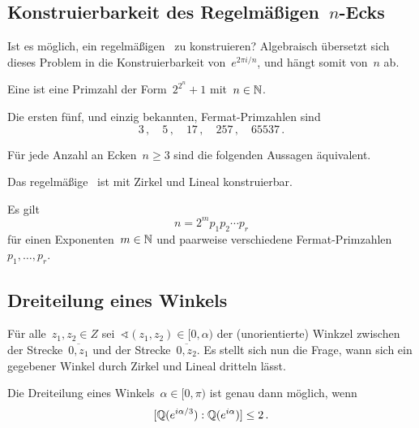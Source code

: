 \subsection{Konstruierbarkeit des Regelmäßigen~\texorpdfstring{$n$}{n}-Ecks}

Ist es möglich, ein regelmäßigen~ zu konstruieren?
Algebraisch übersetzt sich dieses Problem in die Konstruierbarkeit von~$e^{2 \pi i / n}$, und hängt somit von~$n$ ab.

\begin{definition}
  Eine  ist eine Primzahl der Form~$2^{2^n} + 1$ mit~$n \in \mathbb{N}$.
\end{definition}

\begin{example}
  Die ersten fünf, und einzig bekannten, Fermat-Primzahlen sind
  \[
    3 \,,
    \quad
    5 \,,
    \quad
    17 \,,
    \quad
    257 \,,
    \quad
    65537 \,.
  \]
\end{example}

\begin{theorem}[Gauß]
  Für jede Anzahl an Ecken~$n \geq 3$ sind die folgenden Aussagen äquivalent.
  \begin{equivlist}
    \item
      Das regelmäßige~ ist mit Zirkel und Lineal konstruierbar.
    \item
      Es gilt
      \[
        n = 2^m p_1 p_2 \dotsm p_r
      \]
      für einen Exponenten~$m \in \mathbb{N}$ und paarweise verschiedene Fermat-Primzahlen~$p_1, \dotsc, p_r$.
  \end{equivlist}
\end{theorem}



\subsection{Dreiteilung eines Winkels}

Für alle~$z_1, z_2 \in Z$ sei~$\sphericalangle(z_1, z_2) \in [0, \alpha)$ der (unorientierte) Winkzel zwischen der Strecke~$\overline{0,z_1}$ und der Strecke~$\overline{0,z_2}$.
Es stellt sich nun die Frage, wann sich ein gegebener Winkel durch Zirkel und Lineal dritteln lässt.

\begin{proposition}
  Die Dreiteilung eines Winkels~$\alpha \in [0, \pi)$ ist genau dann möglich, wenn
  \[
    [ \mathbb{Q}( e^{i \alpha / 3}  ) : \mathbb{Q}( e^{i \alpha} ) ]
    \leq 2
    \,.
  \]
\end{proposition}





